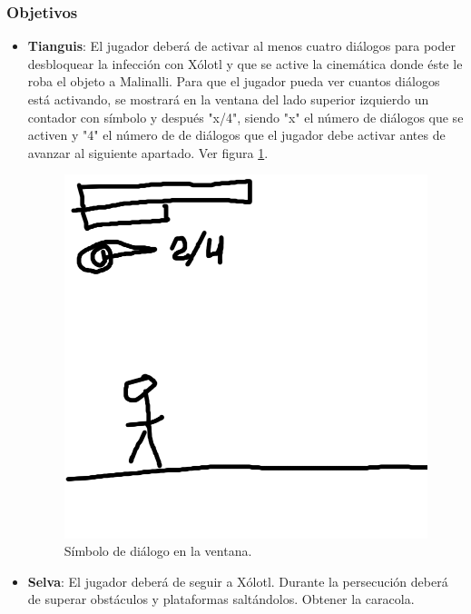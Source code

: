 \documentclass[11pt,letterpaper]{article}
\begin{document}
	\subsubsection{Objetivos}
\begin{itemize}
	\item \textbf{Tianguis}:
	El jugador deberá de activar al menos cuatro diálogos para poder desbloquear la infección con Xólotl y que se active la cinemática donde éste le roba el objeto a Malinalli.
	Para que el jugador pueda ver cuantos diálogos está activando, se mostrará en la ventana del lado superior izquierdo un contador con símbolo y después "x/4", siendo "x" el número de diálogos que se activen y "4" el número de de diálogos que el jugador debe activar antes de avanzar al siguiente apartado.
				Ver figura \ref{fig:ventanaSimboloDialogo}.
				\begin{figure}
					\centering
					\includegraphics[height=0.2 \textheight]{Imagenes/ventanaSimboloDialogo}
					\caption{Símbolo de diálogo en la ventana.}
					\label{fig:ventanaSimboloDialogo}
				\end{figure}
	\item \textbf{Selva}: El jugador deberá de seguir a Xólotl. Durante la persecución deberá de superar obstáculos y plataformas saltándolos. Obtener la caracola.
\end{itemize}
\end{document}
